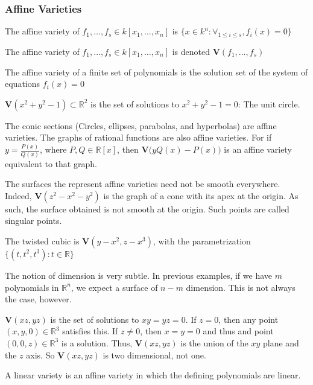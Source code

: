 \documentclass[crop=false,class=book,oneside]{standalone}
\begin{document}
\subsubsection{Affine Varieties}
\begin{definition}
The affine variety of $f_1,\hdots, f_s \in k[x_1,\hdots ,x_n]$ is $\{x\in k^n:\forall_{1\leq i \leq s},f_i(x) = 0\}$
\end{definition}
\begin{notation}
The affine variety of $f_{1},\hdots,f_{s}\in k[x_{1},\hdots,x_{n}]$ is denoted $\mathbf{V}(f_1,\hdots, f_s)$
\end{notation}
The affine variety of a finite set of polynomials is the solution set of the system of equations $f_{i}(x)=0$
\begin{example}
$\mathbf{V}(x^2+y^2-1)\subset\mathbb{R}^2$ is the set of solutions to $x^2+y^2-1 = 0$: The unit circle.
\end{example}
\begin{example}
The conic sections (Circles, ellipses, parabolas, and hyperbolas) are affine varieties. The graphs of rational functions are also affine varieties. For if $y = \frac{P(x)}{Q(x)}$, where $P,Q\in \mathbb{R}[x]$, then $\mathbf{V}\big(yQ(x)-P(x)\big)$ is an affine variety equivalent to that graph.
\end{example}
\begin{example}
The surfaces the represent affine varieties need not be smooth everywhere. Indeed, $\mathbf{V}(z^2-x^2-y^2)$ is the graph of a cone with its apex at the origin. As such, the surface obtained is not smooth at the origin. Such points are called singular points.
\end{example}
\begin{example}
The twisted cubic is $\mathbf{V}(y-x^2,z-x^3)$, with the parametrization $\{(t,t^2,t^3):t\in \mathbb{R}\}$
\end{example}
The notion of dimension is very subtle. In previous examples, if we have $m$ polynomials in $\mathbb{R}^n$, we expect a surface of $n-m$ dimension. This is not always the case, however.
\begin{example}
$\mathbf{V}(xz,yz)$ is the set of solutions to $xy=yz=0$. If $z=0$, then any point $(x,y,0)\in \mathbb{R}^3$ satisfies this. If $z\ne 0$, then $x=y=0$ and thus and point $(0,0,z)\in \mathbb{R}^3$ is a solution. Thus, $\mathbf{V}(xz,yz)$ is the union of the $xy$ plane and the $z$ axis. So $\mathbf{V}(xz,yz)$ is two dimensional, not one.
\end{example}
\begin{definition}
A linear variety is an affine variety in which the defining polynomials are linear.
\end{definition}
\end{document}
